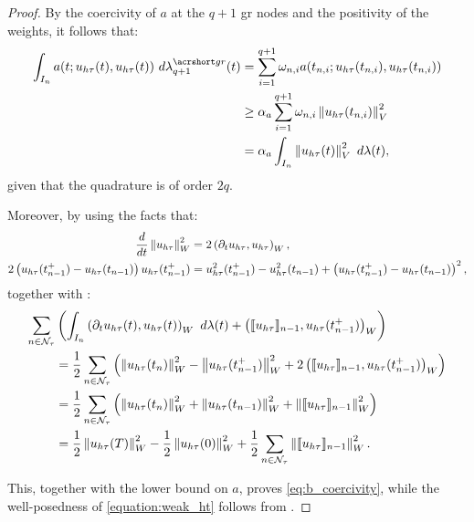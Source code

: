 \begin{proof}
    By the coercivity of $a$ at the $q + 1$ \acrshort{gr} nodes and the positivity of the weights, it follows that:
    \begin{align*}
        \int_{I_n} a(t; u_{h \tau}(t), u_{h \tau}(t)) ~ d \lambdaGR_{q + 1}(t) &= \sum_{i = 1}^{q + 1} \omega_{n, i} a(t_{n, i}; u_{h \tau}(t_{n, i}), u_{h \tau}(t_{n, i})) \\
        &\geq \CoerC{a} \sum_{i = 1}^{q + 1} \omega_{n, i} \Norm{ u_{h \tau}(t_{n, i}) }_V^2 \\
        &= \CoerC{a} \int_{I_n} \Norm{ u_{h \tau}(t) }_V^2 ~ d \lambda(t),
    \end{align*}
    given that the quadrature is of order $2q$.

    Moreover, by using the facts that:
    \begin{align*}
        \frac{d}{dt} \left\lVert  u_{h \tau}  \right\rVert_W^2 &= 2 \left( \partial_t u_{h \tau}, u_{h \tau} \right)_W, \\
        2 \left( u_{h \tau}(t_{n - 1}^+) - u_{h \tau}(t_{n - 1}) \right) u_{h \tau}(t_{n - 1}^+) &= u_{h \tau}^2(t_{n - 1}^+) - u_{h \tau}^2(t_{n - 1}) + \left( u_{h \tau}(t_{n - 1}^+) - u_{h \tau}(t_{n - 1}) \right)^2,
    \end{align*}
    together with :
    \begin{align*}
        \sum_{n \in \mathcal{N}_{\tau}} &\left( \int_{I_n} \left( \partial_t u_{h \tau}(t), u_{h \tau}(t) \right)_W ~ d \lambda(t) + \left( \llbracket u_{h \tau} \rrbracket_{n - 1}, u_{h \tau}(t_{n - 1}^+) \right)_W \right) \\
        &= \frac12 \sum_{n \in \mathcal{N}_{\tau}} \left( \left\lVert  u_{h \tau}(t_n)  \right\rVert_W^2 - \left\lVert  u_{h \tau}(t_{n - 1}^+)  \right\rVert_W^2 + 2 \left( \llbracket u_{h \tau} \rrbracket_{n - 1}, u_{h \tau}(t_{n - 1}^+) \right)_W \right) \\
        &= \frac12 \sum_{n \in \mathcal{N}_{\tau}} \left( \left\lVert  u_{h \tau}(t_n)  \right\rVert_W^2 + \left\lVert  u_{h \tau}(t_{n - 1})  \right\rVert_W^2 + \left\lVert  \llbracket u_{h \tau} \rrbracket_{n - 1}  \right\rVert_W^2 \right) \\
        &= \frac12 \left\lVert  u_{h \tau}(T)  \right\rVert_W^2 - \frac12 \left\lVert  u_{h \tau}(0)  \right\rVert_W^2 + \frac12 \sum_{n \in \mathcal{N}_{\tau}} \left\lVert  \llbracket u_{h \tau} \rrbracket_{n - 1}  \right\rVert_W^2.
    \end{align*}

    This, together with the lower bound on $a$, proves \cref{eq:b_coercivity}, while the well-posedness of \cref{equation:weak_ht} follows from .
\end{proof}

